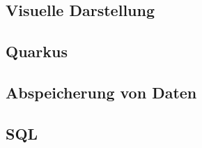 \begin{spacing}{1}
    \section{Visuelle Darstellung}\label{section:gui}
    \end{spacing}


\begin{spacing}{1}
    \section{Quarkus}\label{section:quarkus}
    \end{spacing}


\begin{spacing}{1}
    \section{Abspeicherung von Daten}\label{section:savedata}
    \end{spacing}


\begin{spacing}{1}
    \section{SQL}\label{section:sql}
    \end{spacing}


